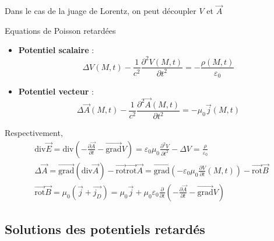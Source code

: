 Dans le cas de la juage de Lorentz, on peut découpler $V$ et $\overrightarrow{A}$

\begin{Prop}{Equations de Poisson retardées}{}
  \begin{itemize}

      \item \textbf{Potentiel scalaire} :
        \begin{equation}
          \Delta V(M,t) - \frac{1}{c ^{2}}  \frac{\partial ^{2}V(M,t)}{\partial t ^{2}}  = - \frac{\rho(M,t)}{\varepsilon_0} 
        \end{equation}
      \item \textbf{Potentiel vecteur} :
        \begin{equation}
          \Delta \overrightarrow{A}(M,t) - \frac{1}{c ^{2}}  \frac{\partial ^{2} \overrightarrow{A}(M,t)}{\partial t ^{2}}  = - \mu_0 \overrightarrow{j}(M,t)
        \end{equation}


  \end{itemize}
\end{Prop}

\begin{myproof}{}{} Respectivement, 
\begin{gather}
  \mathrm{div} \overrightarrow{E} = \mathrm{div} \left( - \frac{\partial \overrightarrow{A}}{\partial t} - \overrightarrow{\mathrm{grad}}V \right) = \varepsilon_0 \mu_0 \frac{\partial  ^{2}V}{\partial t ^{2}}  - \Delta V = \frac{\rho}{\varepsilon_0}  \\ 
  \Delta \overrightarrow{A} = \overrightarrow{\mathrm{grad}}(\mathrm{div} \overrightarrow{A}) - \overrightarrow{\mathrm{rot}}\overrightarrow{\mathrm{rot}}\overrightarrow{A} = \overrightarrow{\mathrm{grad}} \left( - \varepsilon_0 \mu_0 \frac{\partial V}{\partial t} (M,t) \right) - \overrightarrow{\mathrm{rot}}\overrightarrow{B} \\ 
\overrightarrow{\mathrm{rot}} \overrightarrow{B} = \mu_0 (\overrightarrow{j} + \overrightarrow{j_D}) = \mu_0 \overrightarrow{j} + \mu_0 \varepsilon_0 \frac{\partial }{\partial t} \left( - \frac{\partial \overrightarrow{A}}{\partial t}  - \overrightarrow{\mathrm{grad}}V \right)
\end{gather}


\end{myproof}



\subsection{Solutions des potentiels retardés} %
\label{sub:Solutions des potentiels retardés}

